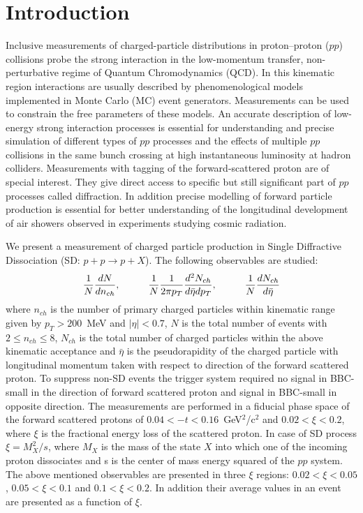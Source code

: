 \chapter{Introduction}\label{chapter:introduction}
Inclusive measurements of charged-particle distributions in proton–proton ($pp$) collisions probe the strong interaction in the low-momentum transfer, non-perturbative regime of Quantum Chromodynamics (QCD). In this kinematic region interactions are usually described by phenomenological models implemented in Monte Carlo (MC) event generators. Measurements can be used to constrain the free parameters of these models. An accurate description of low-energy strong interaction processes is essential for understanding and precise simulation of different types of $pp$ processes and the effects of multiple $pp$ collisions in the same bunch crossing at high instantaneous luminosity at hadron colliders. Measurements with tagging of the forward-scattered proton are of special interest. They give direct access to specific but still significant part of $pp$ processes called diffraction. In addition precise modelling of forward particle production is essential for better understanding of the longitudinal development of air showers observed in experiments studying cosmic radiation.

We present a measurement of charged particle production in Single Diffractive Dissociation (SD: $p+p\to p+X$). The following observables are studied:
\begin{equation}
\frac{1}{N}\frac{dN}{dn_{ch}},\textrm{\hspace{1cm}} 
\frac{1}{N}\frac{1}{2\pi p_T}\frac{d^2N_{ch}}{d\bar{\eta}dp_T},\textrm{\hspace{1cm}} 
\frac{1}{N}\frac{dN_{ch}}{d\bar{\eta}}
\end{equation}
where $n_{ch}$ is the number of primary charged particles within kinematic range given by $p_T>200$~MeV and $|\eta|<0.7$, $N$ is the 
total number of events with $2\leq n_{ch}\leq8$, $N_{ch}$ is the total number of charged particles within the above kinematic acceptance and $\bar{\eta}$ is the pseudorapidity of the charged particle with longitudinal momentum taken with respect to direction of the forward scattered proton. To suppress non-SD events the trigger system required no signal in BBC-small in the direction of forward scattered proton and signal in BBC-small in opposite direction. The 
measurements are performed in a fiducial phase space of the forward scattered protons of $0.04<-t<0.16$~GeV$^2$/c$^2$ and 
$0.02<\xi<0.2$, where $\xi$ is the fractional energy loss of the scattered proton. In case of SD process $\xi=M^2_X/s$, where $M_X$ is 
the mass of the state $X$ into which one of the incoming proton dissociates and s is the center of mass energy squared of the $pp$ system. The above mentioned observables are presented in three $\xi$ 
regions: $0.02<\xi<0.05$, $0.05<\xi<0.1$ and $0.1<\xi<0.2$. In addition their average values in an event are presented as a function of $\xi$.

